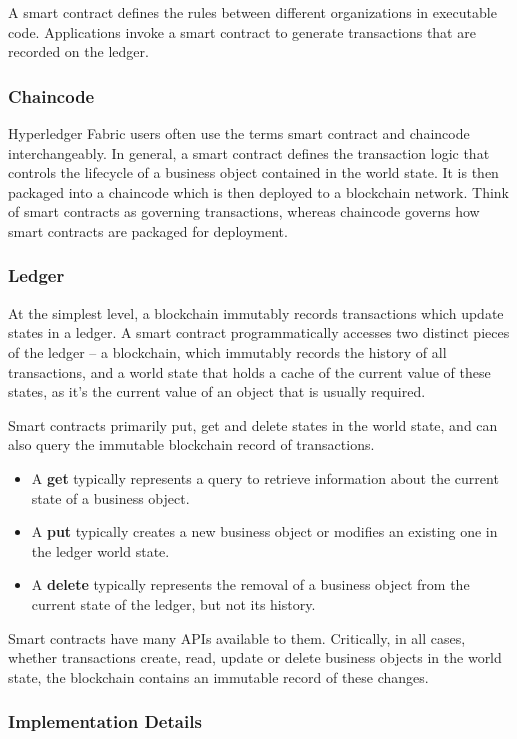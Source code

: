 A smart contract defines the rules between different organizations in executable code. Applications invoke a smart contract to generate transactions that are recorded on the ledger.

\subsubsection{Chaincode}
Hyperledger Fabric users often use the terms smart contract and chaincode interchangeably. In general, a smart contract defines the transaction logic that controls the lifecycle of a business object contained in the world state. It is then packaged into a chaincode which is then deployed to a blockchain network. Think of smart contracts as governing transactions, whereas chaincode governs how smart contracts are packaged for deployment.

\subsubsection{Ledger}
At the simplest level, a blockchain immutably records transactions which update states in a ledger. A smart contract programmatically accesses two distinct pieces of the ledger – a blockchain, which immutably records the history of all transactions, and a world state that holds a cache of the current value of these states, as it’s the current value of an object that is usually required.

Smart contracts primarily put, get and delete states in the world state, and can also query the immutable blockchain record of transactions.

\begin{itemize}
\item A \textbf{get} typically represents a query to retrieve information about the current state of a business object.
\item A \textbf{put} typically creates a new business object or modifies an existing one in the ledger world state.
\item A \textbf{delete} typically represents the removal of a business object from the current state of the ledger, but not its history.
\end{itemize}

Smart contracts have many APIs available to them. Critically, in all cases, whether transactions create, read, update or delete business objects in the world state, the blockchain contains an immutable record of these changes.

\subsubsection{Implementation Details}\label{sec:Implementation}

